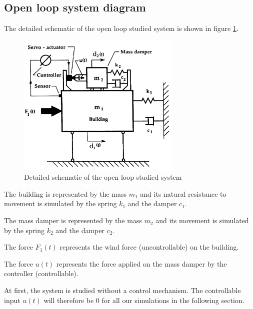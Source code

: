 \subsection{Open loop system diagram}
The detailed schematic of the open loop studied system is shown in figure \ref{fig:detailed_schematic}.
\begin{figure}[H]
    \centering
    \includegraphics[width=0.7\textwidth]{resources/pdf/1_open-loop-diagram.pdf}
    \caption{Detailed schematic of the open loop studied system \cite{YANG201718}}
    \label{fig:detailed_schematic}
\end{figure}
The building is represented by the mass $m_1$ and its natural resistance to movement is simulated by the spring $k_1$ and the damper $c_1$.\par
The mass damper is represented by the mass $m_2$ and its movement is simulated by the spring $k_2$ and the damper $c_2$.\par
The force $F_1(t)$ represents the wind force (uncontrollable) on the building.\par
The force $u(t)$ represents the force applied on the mass damper by the controller (controllable).\par
At first, the system is studied without a control mechanism. The controllable input $u(t)$ will therefore be \num{0} for all our simulations in the following section.
